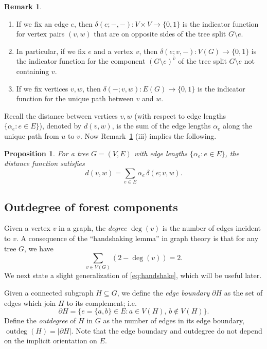 \documentclass[12pt]{amsart}
\newtheorem{prop}[thm]{Proposition}
\theoremstyle{definition}
\newtheorem{rmk}[thm]{Remark}
\DeclareMathOperator{\outdeg}{outdeg}
\begin{document}
\begin{rmk}\label{rmk:delta-properties}
\hfill
\begin{enumerate}[label=(\roman*)]
\item If we fix an edge $e$, then $\delta(e; -, -): V \times V \to \{0, 1\}$ is the indicator function for vertex pairs $(v, w)$ that are on opposite sides of the tree split $G \setminus e$.

\item 
In particular, if we fix $e$ and a vertex $v$,
then $\delta(e;v, -) \colon V(G) \to \{0,1\}$ 
is the indicator function for the component 
$(G \setminus e)^{\overline v}$ of the tree split $G \setminus e$ not containing $v$.

\item If we fix vertices $v, w$, then $\delta(-;v,w) \colon E(G) \to \{0,1\}$
is the indicator function for the unique path between $v$ and $w$.
\end{enumerate}
\end{rmk}

Recall the distance between vertices $v,w$ (with respect to edge lengths $\{ \alpha_e \colon e \in E\}$), denoted by $d(v,w)$, is the sum of the edge lengths $\alpha_e$ along the unique path from $u$ to $v$. Now Remark~\ref{rmk:delta-properties} (iii) implies the following.

\begin{prop}
\label{prop:distance-sum}
For a tree $G = (V,E)$ with edge lengths $\{\alpha_e \colon e \in E\}$, the distance function satisfies
\[ 
	d(v,w) = \sum_{e \in E} \alpha_e \, \delta(e; v,w) .
\]
\end{prop}

\subsection{Outdegree of forest components}
\label{sec:outdegree}

Given a vertex $v$ in a graph, the {\em degree} $\deg(v)$ is the number of edges incident to $v$.
A consequence of the ``handshaking lemma'' in graph theory is that for any tree $G$, we have
\begin{equation}\label{eq:handshake}
	\sum_{v \in V(G)} (2 - \deg(v)) = 2.
\end{equation}
We next state a slight generalization of \eqref{eq:handshake}, which will be useful later.

Given a connected subgraph $H \subseteq G$,
we define the {\em edge boundary} $\partial H$ as the set of edges which join $H$ to its complement; i.e.
\begin{equation*}
	\partial H = \{ e = \{a,b\} \in E \colon a \in V(H),\, b \not\in V(H)\}.
\end{equation*}
Define the {\em outdegree} of $H$ in $G$ as the number of edges in its edge boundary, $\outdeg(H) = |\partial H|$.
Note that the edge boundary and outdegree do not depend on the implicit orientation on $E$.
\end{document}

